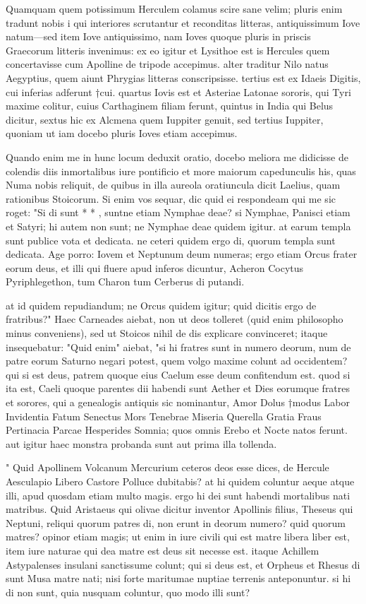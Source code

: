  Quamquam quem potissimum Herculem colamus scire sane velim; pluris enim tradunt nobis i qui interiores scrutantur et reconditas litteras, antiquissimum Iove natum—sed item Iove antiquissimo, nam Ioves quoque pluris in priscis Graecorum litteris invenimus: ex eo igitur et Lysithoe est is Hercules quem concertavisse cum Apolline de tripode accepimus. alter traditur Nilo natus Aegyptius, quem aiunt Phrygias litteras conscripsisse. tertius est ex Idaeis Digitis, cui inferias adferunt †cui. quartus Iovis est et Asteriae Latonae sororis, qui Tyri maxime colitur, cuius Carthaginem filiam ferunt, quintus in India qui Belus dicitur, sextus hic ex Alcmena quem Iuppiter genuit, sed tertius Iuppiter, quoniam ut iam docebo pluris Ioves etiam accepimus.

 Quando enim me in hunc locum deduxit oratio, docebo meliora me didicisse de colendis diis inmortalibus iure pontificio et more maiorum capedunculis his, quas Numa nobis reliquit, de quibus in illa aureola oratiuncula dicit Laelius, quam rationibus Stoicorum. Si enim vos sequar, dic quid ei respondeam qui me sic roget: "Si di sunt * * , suntne etiam Nymphae deae? si Nymphae, Panisci etiam et Satyri; hi autem non sunt; ne Nymphae deae quidem igitur. at earum templa sunt publice vota et dedicata. ne ceteri quidem ergo di, quorum templa sunt dedicata. Age porro: Iovem et Neptunum deum numeras; ergo etiam Orcus frater eorum deus, et illi qui fluere apud inferos dicuntur, Acheron Cocytus Pyriphlegethon, tum Charon tum Cerberus di putandi.

 at id quidem repudiandum; ne Orcus quidem igitur; quid dicitis ergo de fratribus?" Haec Carneades aiebat, non ut deos tolleret (quid enim philosopho minus conveniens), sed ut Stoicos nihil de dis explicare convinceret; itaque insequebatur: "Quid enim" aiebat, "si hi fratres sunt in numero deorum, num de patre eorum Saturno negari potest, quem volgo maxime colunt ad occidentem? qui si est deus, patrem quoque eius Caelum esse deum confitendum est. quod si ita est, Caeli quoque parentes dii habendi sunt Aether et Dies eorumque fratres et sorores, qui a genealogis antiquis sic nominantur, Amor Dolus †modus Labor Invidentia Fatum Senectus Mors Tenebrae Miseria Querella Gratia Fraus Pertinacia Parcae Hesperides Somnia; quos omnis Erebo et Nocte natos ferunt. aut igitur haec monstra probanda sunt aut prima illa tollenda.

 " Quid Apollinem Volcanum Mercurium ceteros deos esse dices, de Hercule Aesculapio Libero Castore Polluce dubitabis? at hi quidem coluntur aeque atque illi, apud quosdam etiam multo magis. ergo hi dei sunt habendi mortalibus nati matribus. Quid Aristaeus qui olivae dicitur inventor Apollinis filius, Theseus qui Neptuni, reliqui quorum patres di, non erunt in deorum numero? quid quorum matres? opinor etiam magis; ut enim in iure civili qui est matre libera liber est, item iure naturae qui dea matre est deus sit necesse est. itaque Achillem Astypalenses insulani sanctissume colunt; qui si deus est, et Orpheus et Rhesus di sunt Musa matre nati; nisi forte maritumae nuptiae terrenis anteponuntur. si hi di non sunt, quia nusquam coluntur, quo modo illi sunt?

